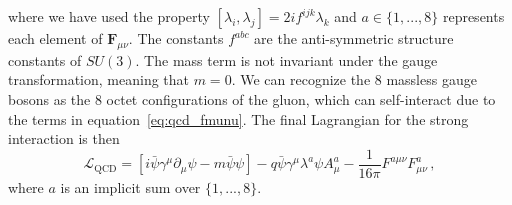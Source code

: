 where we have used the property $[\lambda_i,\lambda_j]=2if^{ijk}\lambda_k$ and $a\in\{1,...,8\}$ represents each element of $\mathbf{F}_{\mu\nu}$. The constants $f^{abc}$ are the anti-symmetric structure constants of $SU(3)$. The mass term is not invariant under the gauge transformation, meaning that $m=0$. We can recognize the 8 massless gauge bosons as the 8 octet configurations of the gluon, which can self-interact due to the terms in equation~\ref{eq:qcd_fmunu}. The final Lagrangian for the strong interaction is then
\begin{equation}
	\mathcal{L}_\text{QCD}=\left[i\bar{\psi}\gamma^\mu\partial_\mu\psi-m\bar{\psi}\psi\right]-q\bar{\psi}\gamma^\mu\lambda^a\psi A_\mu^a-\frac{1}{16\pi}F^{a\mu\nu}F^{a}_{\mu\nu}\,,
\end{equation}
where $a$ is an implicit sum over $\{1,...,8\}$.

